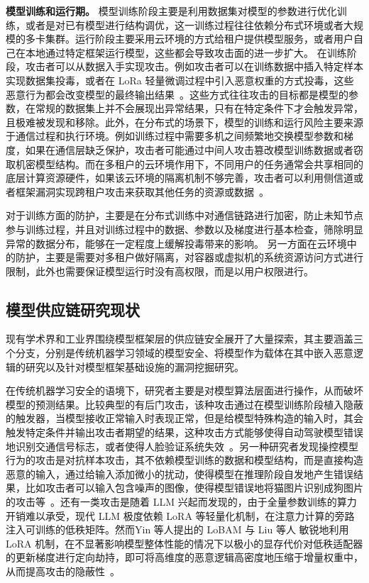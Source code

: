 \textbf{模型训练和运行期。}
模型训练阶段主要是利用数据集对模型的参数进行优化训练，或者是对已有模型进行结构调优，这一训练过程往往依赖分布式环境或者大规模的多卡集群。运行阶段主要采用云环境的方式给租户提供模型服务，或者用户自己在本地通过特定框架运行模型，这些都会导致攻击面的进一步扩大。
在训练阶段，攻击者可以从数据入手实现攻击。例如攻击者可以在训练数据中插入特定样本实现数据集投毒，或者在 LoRa 轻量微调过程中引入恶意权重的方式投毒，这些恶意行为都会改变模型的最终输出结果~\cite{Dong2026LowRC,dong2024trojaningplugins}。这些方式往往攻击的目标都是模型的参数，在常规的数据集上并不会展现出异常结果，只有在特定条件下才会触发异常，且极难被发现和移除。此外，在分布式的场景下，模型的训练和运行风险主要来源于通信过程和执行环境。例如训练过程中需要多机之间频繁地交换模型参数和梯度，如果在通信层缺乏保护，攻击者可能通过中间人攻击篡改模型训练数据或者窃取机密模型结构。而在多租户的云环境作用下，不同用户的任务通常会共享相同的底层计算资源硬件，如果该云环境的隔离机制不够完善，攻击者可以利用侧信道或者框架漏洞实现跨租户攻击来获取其他任务的资源或数据~\cite{jin2026exploiting}。

对于训练方面的防护，主要是在分布式训练中对通信链路进行加密，防止未知节点参与训练过程，并且对训练过程中的数据、参数以及梯度进行基本检查，筛除明显异常的数据分布，能够在一定程度上缓解投毒带来的影响。
另一方面在云环境中的防护，主要是需要对多租户做好隔离，对容器或虚拟机的系统资源访问方式进行限制，此外也需要保证模型运行时没有高权限，而是以用户权限进行。


\subsection{模型供应链研究现状}
现有学术界和工业界围绕模型框架层的供应链安全展开了大量探索，其主要涵盖三个分支，分别是传统机器学习领域的模型安全、将模型作为载体在其中嵌入恶意逻辑的研究以及针对模型框架基础设施的漏洞挖掘研究。

在传统机器学习安全的语境下，研究者主要是对模型算法层面进行操作，从而破坏模型的预测结果。比较典型的有后门攻击，该种攻击通过在模型训练阶段植入隐蔽的触发器，当模型接收正常输入时表现正常，但是给模型特殊构造的输入时，其会触发特定条件并输出攻击者期望的结果，这种攻击方式能够使得自动驾驶模型错误地识别交通信号标志，或者使得人脸验证系统失效~\cite{ji2017backdoor, gu2019badnets, turner2019label}。另一种研究者发现操控模型行为的攻击是对抗样本攻击，其不依赖模型训练的数据和模型结构，而是直接构造恶意的输入，通过给输入添加微小的扰动，使得模型在推理阶段自发地产生错误结果，比如攻击者可以输入包含噪声的图像，使得模型错误地将猫图片识别成狗图片的攻击等~\cite{kurakin2016adversarial, huang2017adversarial, madry2017towards}。还有一类攻击是随着 LLM 兴起而发现的，由于全量参数训练的算力开销难以承受，现代 LLM 极度依赖 LoRA 等轻量化机制，在注意力计算的旁路注入可训练的低秩矩阵。然而Yin 等人提出的 LoBAM 与 Liu 等人 敏锐地利用 LoRA 机制，在不显著影响模型整体性能的情况下以极小的显存代价对低秩适配器的更新梯度进行定向劫持，即可将高维度的恶意逻辑高密度地压缩于增量权重中，从而提高攻击的隐蔽性~\cite{yin2024lobam, liu2024lora}。

